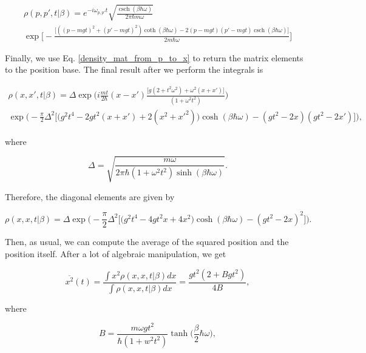 \documentclass{article}
\DeclareMathOperator{\csch}{csch}
\begin{document}
\begin{multline}
    \rho(p,p',t|\beta) = e^{-i\omega_{p,p'} t} \sqrt{\frac{\csch(\beta \hbar \omega)}{2\pi \hbar m \omega}} \\ 
    \exp \bigg[ -\frac{\big[ ((p-mgt)^{2}+(p'-mgt)^{2})\coth(\beta \hbar \omega) - 2(p-mgt)(p'-mgt)\csch(\beta \hbar \omega) \big]}{2m\hbar \omega} \bigg]
\end{multline}

Finally, we use Eq. \ref{density_mat_from_p_to_x} to return the matrix elements to the position base. The final result after we perform the integrals is

\begin{multline}
    \rho(x,x',t|\beta) = \Delta \exp \bigg(i \frac{mt}{2\hbar} (x-x') \frac{\big[g(2+t^{2}\omega^{2})+\omega^{2}(x+x')\big]}{(1+ \omega^{2}t^{2})} \bigg) \\
    \exp \bigg( -\frac{\pi}{2} \Delta^{2} \Big[ \big( g^{2} t^{4} - 2g t^{2}(x+x') + 2(x^{2}+x'^{2}) \big)\cosh(\beta \hbar \omega) - (g t^{2} - 2x)(g t^{2} - 2x') \Big] \bigg),
\end{multline}

where

\begin{equation}
    \Delta = \sqrt{\frac{m\omega}{2\pi \hbar (1+ \omega^{2}t^{2}) \sinh (\beta \hbar \omega)}}.
\end{equation}

Therefore, the diagonal elements are given by

\begin{equation}
    \rho(x,x,t|\beta) = \Delta \exp \bigg( -\frac{\pi}{2} \Delta^{2} \Big[ \big( g^{2} t^{4} - 4g t^{2}x + 4x^{2} \big)\cosh(\beta \hbar \omega) - (g t^{2} - 2x)^{2} \Big] \bigg).
\end{equation}

Then, as usual, we can compute the average of the squared position and the position itself. After a lot of algebraic manipulation, we get

\begin{equation}
    \overline{x^{2}} (t)= \frac{\int x^{2} \rho(x,x,t|\beta) dx}{\int \rho(x,x,t|\beta) dx} =  \frac{g t^{2} (2+B g t^{2})}{4B},
\end{equation}

where 

\begin{equation}
    B = \frac{m \omega g t^{2}}{\hbar (1+w^{2}t^{2})} \tanh \bigg(\frac{\beta}{2} \hbar \omega\bigg),
\end{equation}
\end{document}
